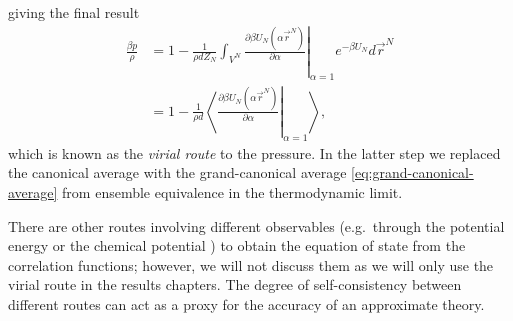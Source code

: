 giving the final result
\begin{equation}\label{eq:virial-route-pressure}
  \begin{split}
    \frac{\beta p}{\rho}
    &=
    1
    -
    \frac{1}{\rho d Z_N}
    \int_{V^N}
    \left.
    \frac{\partial \beta U_N(\alpha \vec{r}^N)}{\partial \alpha}
    \right|_{\alpha = 1}
    e^{-\beta U_N}
    d\vec{r}^N
    \\ &=
    1
    -
    \frac{1}{\rho d}
    \left\langle
    \left.
    \frac{\partial \beta U_N(\alpha \vec{r}^N)}{\partial \alpha}
    \right|_{\alpha = 1}
    \right\rangle,
  \end{split}
\end{equation}
which is known as the \emph{virial route}%
to the pressure.
In the latter step we replaced the canonical average with the grand-canonical average \eqref{eq:grand-canonical-average} from ensemble equivalence in the thermodynamic limit.

There are other routes involving different observables (e.g.\ through the potential energy or the chemical potential \cite{Santos2016}) to obtain the equation of state from the correlation functions; however, we will not discuss them as we will only use the virial route in the results chapters.
The degree of self-consistency between different routes can act as a proxy for the accuracy of an approximate theory.

